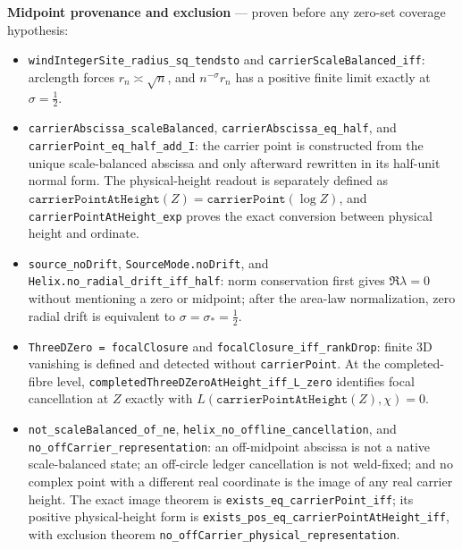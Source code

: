 \medskip
\noindent\textbf{Midpoint provenance and exclusion} --- proven before any
zero-set coverage hypothesis:
\begin{itemize}
\item \texttt{windIntegerSite\_radius\_sq\_tendsto} and
\texttt{carrierScaleBalanced\_iff}: arclength forces
\(r_n\asymp\sqrt n\), and \(n^{-\sigma}r_n\) has a positive finite limit
exactly at \(\sigma=\tfrac12\).
\item \texttt{carrierAbscissa\_scaleBalanced},
\texttt{carrierAbscissa\_eq\_half}, and
\texttt{carrierPoint\_eq\_half\_add\_I}: the carrier point is constructed
from the unique scale-balanced abscissa and only afterward rewritten in its
half-unit normal form.  The physical-height readout is separately defined as
\(\texttt{carrierPointAtHeight}(Z)=\texttt{carrierPoint}(\log Z)\), and
\texttt{carrierPointAtHeight\_exp} proves the exact conversion between
physical height and ordinate.
\item \texttt{source\_noDrift}, \texttt{SourceMode.noDrift}, and
\texttt{Helix.no\_radial\_drift\_iff\_half}: norm conservation first gives
\(\Re\lambda=0\) without mentioning a zero or midpoint; after the area-law
normalization, zero radial drift is equivalent to
\(\sigma=\sigma_*=\tfrac12\).
\item \texttt{ThreeDZero = focalClosure} and
\texttt{focalClosure\_iff\_rankDrop}: finite 3D vanishing is defined and
detected without \texttt{carrierPoint}.  At the completed-fibre level,
\texttt{completedThreeDZeroAtHeight\_iff\_L\_zero} identifies focal
cancellation at \(Z\) exactly with
\(L(\texttt{carrierPointAtHeight}(Z),\chi)=0\).
\item \texttt{not\_scaleBalanced\_of\_ne},
\texttt{helix\_no\_offline\_cancellation}, and
\texttt{no\_offCarrier\_representation}: an off-midpoint abscissa is
not a native scale-balanced state; an off-circle ledger cancellation is not
weld-fixed; and no complex point with a different real coordinate is the
image of any real carrier height.  The exact image theorem is
\texttt{exists\_eq\_carrierPoint\_iff}; its positive physical-height form is
\texttt{exists\_pos\_eq\_carrierPointAtHeight\_iff}, with exclusion theorem
\texttt{no\_offCarrier\_physical\_representation}.
\end{itemize}

